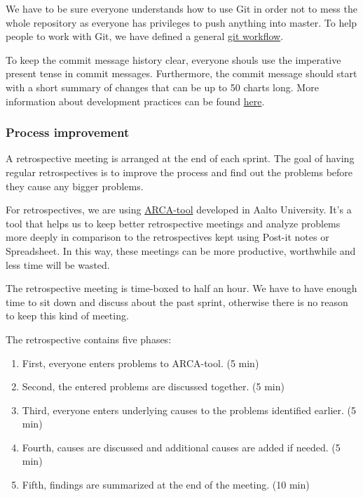 We have to be sure everyone understands how to use Git in order not to mess
the whole repository as everyone has privileges to push anything into master. To
help people to work with Git, we have defined a general
\href{https://docs.google.com/document/d/1wAih0JzkrZ4ySUZ_MO-F8MvGkPXKHicYbG1972Sxo2w/edit?usp=sharing}{git
workflow}. 

To keep the commit message history clear, everyone shouls use the imperative
present tense in commit messages. Furthermore, the commit message should start
with a short summary of changes that can be up to 50 charts long. More
information about development practices can be found
\href{https://docs.google.com/document/d/1Advu6FXwe2axjmO29-fMpw7hbDMeZwJzMF5ad391aBE/edit?usp=sharing}{here}.

\subsubsection{Process improvement}

A retrospective meeting is arranged at the end of each sprint. The goal of
having regular retrospectives is to improve the process and find out the
problems before they cause any bigger problems.

For retrospectives, we are using
\href{http://wirca.soberit.hut.fi/prod/}{ARCA-tool} developed in Aalto
University. It's a tool that helps us to keep better retrospective meetings and
analyze problems more deeply in comparison to the retrospectives kept using
Post-it notes or Spreadsheet. In this way, these meetings can be more
productive, worthwhile and less time will be wasted.

The retrospective meeting is time-boxed to half an hour. We have to have enough
time to sit down and discuss about the past sprint, otherwise there is no reason
to keep this kind of meeting.

The retrospective contains five phases:

\begin{enumerate}
\item First, everyone enters problems to ARCA-tool. (5 min)
\item Second, the entered problems are discussed together. (5 min)
\item Third, everyone enters underlying causes to the problems identified
earlier. (5 min)
\item Fourth, causes are discussed and additional causes are added if needed.
(5 min)
\item Fifth, findings are summarized at the end of the meeting. (10 min)
\end{enumerate}

